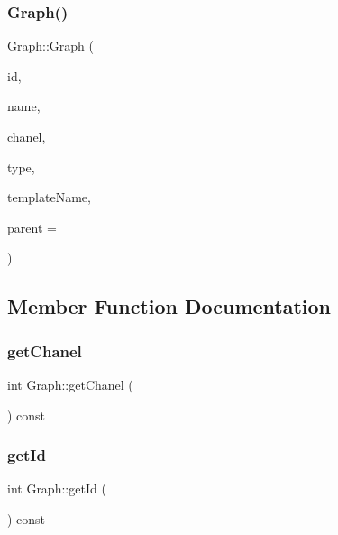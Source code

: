 \subsubsection{\texorpdfstring{Graph()}{Graph()}}
{\footnotesize\ttfamily Graph\+::\+Graph (\begin{DoxyParamCaption}\item[{int}]{id,  }\item[{Q\+String}]{name,  }\item[{int}]{chanel,  }\item[{\hyperlink{class_graph_ab17f5821c439d7728a144639aa849501}{Graph\+::\+G\+R\+A\+P\+H\+I\+C\+T\+Y\+PE}}]{type,  }\item[{Q\+String}]{template\+Name,  }\item[{Q\+Object $\ast$}]{parent = {} }\end{DoxyParamCaption})}



\subsection{Member Function Documentation}
\hypertarget{class_graph_acd7e2b641d29b3c1e4da56903614def5}{}\label{class_graph_acd7e2b641d29b3c1e4da56903614def5} 
\subsubsection{\texorpdfstring{get\+Chanel}{getChanel}}
{\footnotesize\ttfamily int Graph\+::get\+Chanel (\begin{DoxyParamCaption}{ }\end{DoxyParamCaption}) const\hspace{0.3cm}{\ttfamily [slot]}}

\hypertarget{class_graph_a1b9029bdcb34e7dd5e8e90eb4ae26482}{}\label{class_graph_a1b9029bdcb34e7dd5e8e90eb4ae26482} 
\subsubsection{\texorpdfstring{get\+Id}{getId}}
{\footnotesize\ttfamily int Graph\+::get\+Id (\begin{DoxyParamCaption}{ }\end{DoxyParamCaption}) const\hspace{0.3cm}{\ttfamily [slot]}}

